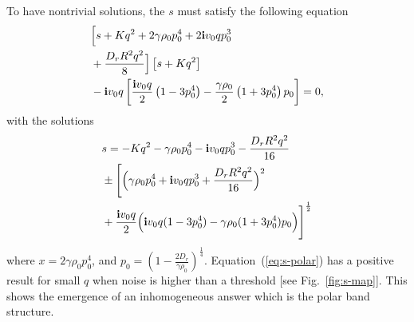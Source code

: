 \documentclass[reprint,floatfix,amsmath,amssymb,aps,pre,showkeys,showpacs,superscriptaddress]{revtex4-1}
\newcommand{\p}{p}
\newcommand{\im}{{\rm \bf i}}
\newcommand{\hl}[1]{\textcolor{hlcolor}{#1}}
\begin{document}
To have nontrivial solutions, the $s$ must satisfy the following equation
\begin{equation}
\begin{aligned}
&\Big[ s + K q^2 + 2 \gamma \rho_0 \p_0^4 + 2 \im v_0 q \p_0^3 \\
&+ \frac{D_r R^2 q^2}{8}  \Big] \left[ s + K q^2 \right] \\
&- \im v_0 q \left[ \frac{\im v_0 q}{2} \left( 1 - 3\p_0^4 \right) - \frac{\gamma \rho_0}{2} \left( 1 + 3 \p_0^4 \right) \p_0  \right]  = 0,
\end{aligned}
\end{equation}
with the solutions
\begin{equation}
\begin{aligned}
&s = - Kq^2 -\gamma \rho_0 \p_0^4 - \im v_0 q \p_0^3 - \frac{D_r R^2 q^2}{16} \\
&\pm \Bigg[ \Big( \gamma \rho_0 \p_0^4 + \im v_0 q \p_0^3 + \frac{D_r R^2 q^2}{16} \Big)^2 \\
&+ \frac{\im v_0 q}{2} \Big( \im v_0 q (1 - 3\p_0^4) - \gamma \rho_0 (1 + 3 \p_0^4) \p_0 \Big)  \Bigg]^\frac{1}{2}
\end{aligned}
\label{eq:s-polar}
\end{equation}
where $x = 2 \gamma \rho_0 \p_0^4$, and $\p_0 = (1 - \frac{2 D_r}{\gamma \rho_0})^{\tfrac{1}{4}}$. Equation~(\ref{eq:s-polar}) has a positive result for small $q$ when noise is higher than a threshold [see Fig.~\ref{fig:s-map}]. This \hl{shows the emergence of an inhomogeneous answer which is the polar band structure.}

%



%
\end{document}
